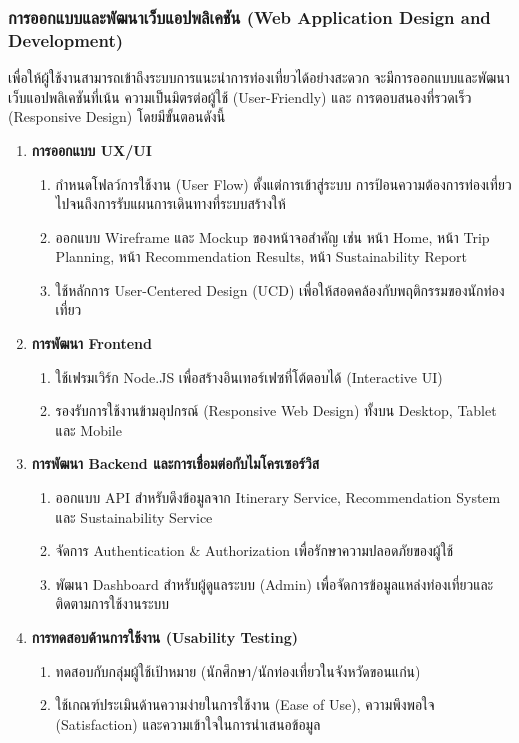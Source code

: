 \subsubsection{การออกแบบและพัฒนาเว็บแอปพลิเคชัน (Web Application Design and Development)}

เพื่อให้ผู้ใช้งานสามารถเข้าถึงระบบการแนะนำการท่องเที่ยวได้อย่างสะดวก จะมีการออกแบบและพัฒนาเว็บแอปพลิเคชันที่เน้น ความเป็นมิตรต่อผู้ใช้ (User-Friendly) และ การตอบสนองที่รวดเร็ว (Responsive Design) โดยมีขั้นตอนดังนี้

\begin{enumerate}[leftmargin=1.8cm]
\item \textbf{การออกแบบ UX/UI}
  \begin{enumerate}[leftmargin=1.8cm]
  \item กำหนดโฟลว์การใช้งาน (User Flow) ตั้งแต่การเข้าสู่ระบบ การป้อนความต้องการท่องเที่ยว ไปจนถึงการรับแผนการเดินทางที่ระบบสร้างให้
  \item ออกแบบ Wireframe และ Mockup ของหน้าจอสำคัญ เช่น หน้า Home, หน้า Trip Planning, หน้า Recommendation Results, หน้า Sustainability Report
  \item ใช้หลักการ User-Centered Design (UCD) เพื่อให้สอดคล้องกับพฤติกรรมของนักท่องเที่ยว
  \end{enumerate}
\item \textbf{การพัฒนา Frontend}
  \begin{enumerate}[leftmargin=1.8cm]
  \item ใช้เฟรมเวิร์ก Node.JS เพื่อสร้างอินเทอร์เฟซที่โต้ตอบได้ (Interactive UI)
  \item รองรับการใช้งานข้ามอุปกรณ์ (Responsive Web Design) ทั้งบน Desktop, Tablet และ Mobile
  \end{enumerate}
\item \textbf{การพัฒนา Backend และการเชื่อมต่อกับไมโครเซอร์วิส}
  \begin{enumerate}[leftmargin=1.8cm]
  \item ออกแบบ API สำหรับดึงข้อมูลจาก Itinerary Service, Recommendation System และ Sustainability Service
  \item จัดการ Authentication \& Authorization เพื่อรักษาความปลอดภัยของผู้ใช้
  \item พัฒนา Dashboard สำหรับผู้ดูแลระบบ (Admin) เพื่อจัดการข้อมูลแหล่งท่องเที่ยวและติดตามการใช้งานระบบ
  \end{enumerate}
\item \textbf{การทดสอบด้านการใช้งาน (Usability Testing)}
  \begin{enumerate}[leftmargin=1.8cm]
  \item ทดสอบกับกลุ่มผู้ใช้เป้าหมาย (นักศึกษา/นักท่องเที่ยวในจังหวัดขอนแก่น)
  \item ใช้เกณฑ์ประเมินด้านความง่ายในการใช้งาน (Ease of Use), ความพึงพอใจ (Satisfaction) และความเข้าใจในการนำเสนอข้อมูล
  \end{enumerate}
\end{enumerate}

